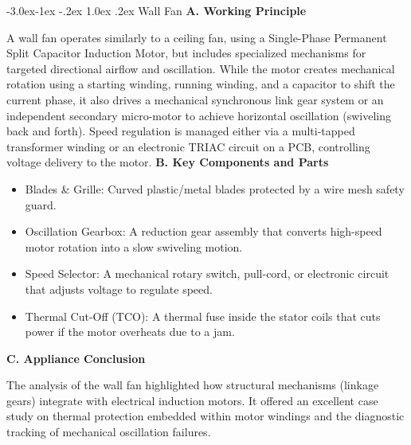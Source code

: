 \documentclass[11pt,a4paper]{report}
\makeatletter
\renewcommand{\subsection}{\@startsection{subsection}{2}{\z@}%
  {-3.0ex\@plus -1ex \@minus -.2ex}%
  {1.0ex \@plus .2ex}%
  {\normalfont\large\bfseries\color{secondaryColor}}}
\makeatother
\begin{document}
\subsection{Wall Fan}
\noindent\textbf{A. Working Principle}\par\medskip
A wall fan operates similarly to a ceiling fan, using a Single-Phase Permanent Split Capacitor Induction Motor, but includes specialized mechanisms for targeted directional airflow and oscillation. While the motor creates mechanical rotation using a starting winding, running winding, and a capacitor to shift the current phase, it also drives a mechanical synchronous link gear system or an independent secondary micro-motor to achieve horizontal oscillation (swiveling back and forth). Speed regulation is managed either via a multi-tapped transformer winding or an electronic TRIAC circuit on a PCB, controlling voltage delivery to the motor.
\noindent\textbf{B. Key Components and Parts}\par\medskip
\begin{itemize}
  \item Blades \& Grille: Curved plastic/metal blades protected by a wire mesh safety guard.
  \item Oscillation Gearbox: A reduction gear assembly that converts high-speed motor rotation into a slow swiveling motion.
  \item Speed Selector: A mechanical rotary switch, pull-cord, or electronic circuit that adjusts voltage to regulate speed.
  \item Thermal Cut-Off (TCO): A thermal fuse inside the stator coils that cuts power if the motor overheats due to a jam.
\end{itemize}
\noindent\textbf{C. Appliance Conclusion}\par\medskip
The analysis of the wall fan highlighted how structural mechanisms (linkage gears) integrate with electrical induction motors. It offered an excellent case study on thermal protection embedded within motor windings and the diagnostic tracking of mechanical oscillation failures.
\end{document}
